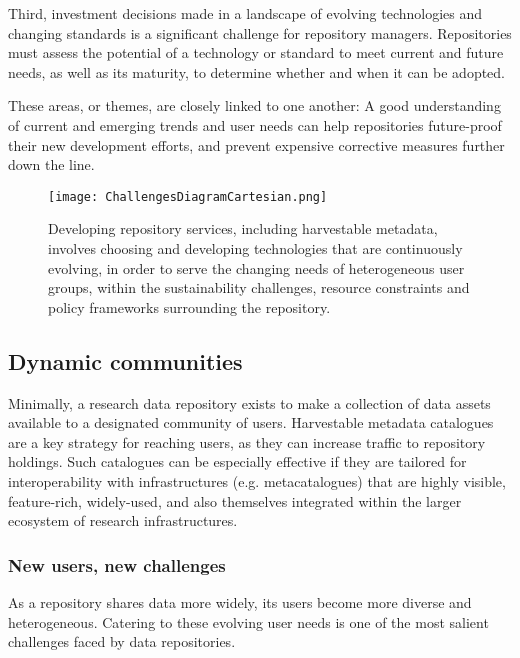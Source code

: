 \documentclass{interact}
\begin{document}
Third, investment decisions made in a landscape of evolving technologies and changing standards is a significant challenge for repository managers. Repositories must assess the potential of a technology or standard to meet current and future needs, as well as its maturity, to determine whether and when it can be adopted. 

These areas, or themes, are closely linked to one another: A good understanding of current and emerging trends and user needs can help repositories future-proof their new development efforts, and prevent expensive corrective measures further down the line. 

\begin{figure}
\centering
\texttt{[image: ChallengesDiagramCartesian.png]}
\caption{Developing repository services, including harvestable metadata, involves choosing and developing technologies that are continuously evolving, in order to serve the changing needs of heterogeneous user groups, within the sustainability challenges, resource constraints and policy frameworks surrounding the repository.} \label{challenges-diagram}
\end{figure}

\subsection{Dynamic communities}
Minimally, a research data repository exists to make a collection of data assets available to a designated community of users. Harvestable metadata catalogues are a key strategy for reaching users, as they can increase traffic to repository holdings. Such catalogues can be especially effective if they are tailored for interoperability with infrastructures (e.g. metacatalogues) that are highly visible, feature-rich, widely-used, and also themselves integrated within the larger ecosystem of research infrastructures. 

\subsubsection{New users, new challenges}
As a repository shares data more widely, its users become more diverse and heterogeneous. Catering to these evolving user needs is one of the most salient challenges faced by data repositories.
\end{document}
